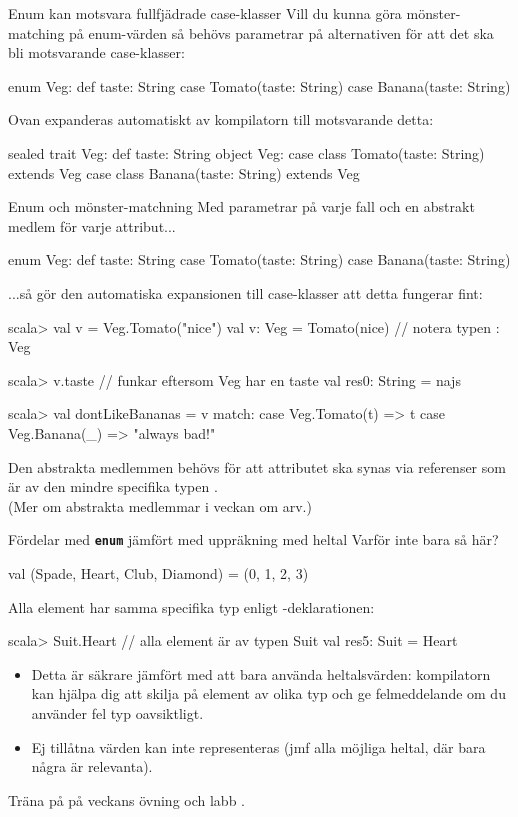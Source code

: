 \begin{Slide}{Enum kan motsvara fullfjädrade case-klasser}
Vill du kunna göra mönster-matching på enum-värden så behövs parametrar på alternativen för att det ska bli motsvarande case-klasser: 
\begin{Code}
enum Veg:
  def taste: String
  case Tomato(taste: String)
  case Banana(taste: String)
\end{Code}
Ovan expanderas automatiskt av kompilatorn till motsvarande detta:
\begin{Code}
sealed trait Veg:
  def taste: String
object Veg:
  case class Tomato(taste: String) extends Veg
  case class Banana(taste: String) extends Veg
\end{Code}
\end{Slide}

\begin{Slide}{Enum och mönster-matchning}
\SlideFontSmall
Med parametrar på varje fall och en abstrakt medlem för varje attribut... 
\begin{Code}
enum Veg:
  def taste: String
  case Tomato(taste: String)
  case Banana(taste: String)
\end{Code}
...så gör den automatiska expansionen till case-klasser att detta fungerar fint: 
\begin{REPLsmall}
scala> val v = Veg.Tomato("nice") 
val v: Veg = Tomato(nice)             // notera typen : Veg

scala> v.taste  // funkar eftersom Veg har en taste
val res0: String = najs

scala> val dontLikeBananas = v match:
           case Veg.Tomato(t) => t 
           case Veg.Banana(_) => "always bad!" 
\end{REPLsmall}
Den abstrakta medlemmen  behövs för att attributet ska synas via referenser som är av den mindre specifika typen .\\(Mer om abstrakta medlemmar i veckan om arv.)

\end{Slide}


\begin{Slide}{Fördelar med \texttt{\textbf{enum}} jämfört med uppräkning med heltal}
Varför inte bara så här?
\begin{Code}
val (Spade, Heart, Club, Diamond) = (0, 1, 2, 3)  
\end{Code}  
Alla element har samma specifika typ enligt -deklarationen:  
\begin{REPL}
scala> Suit.Heart              // alla element är av typen Suit 
val res5: Suit = Heart
\end{REPL}

\begin{itemize}
\item Detta är säkrare jämfört med att bara använda heltalsvärden: kompilatorn kan hjälpa dig att skilja på element av olika typ och ge felmeddelande om du använder fel typ oavsiktligt. 
\item Ej tillåtna värden kan inte representeras (jmf alla möjliga heltal, där bara några är relevanta).
\end{itemize}  
Träna på  på veckans övning  och labb .
\end{Slide}
